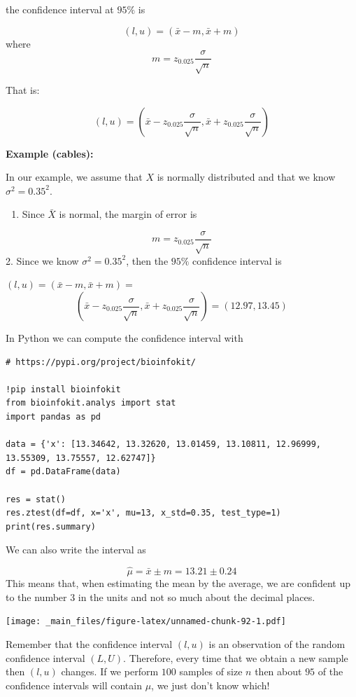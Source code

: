 \documentclass[
]{book}
\providecommand{\tightlist}{%
  \setlength{\itemsep}{0pt}\setlength{\parskip}{0pt}}
\begin{document}
the confidence interval at \(95\%\) is

\[(l,u)=(\bar{x} - m, \bar{x} + m)\]
where \[m=z_{0.025} \frac{\sigma}{\sqrt{n}}\]

That is:

\[(l,u)=(\bar{x} - z_{0.025} \frac{\sigma}{\sqrt{n}}, \bar{x} + z_{0.025} \frac{\sigma}{\sqrt{n}})\]

\textbf{Example (cables):}

In our example, we assume that \(X\) is normally distributed and that we know \(\sigma^2=0.35^2\).

\begin{enumerate}
\def\labelenumi{\arabic{enumi}.}
\tightlist
\item
  Since \(\bar{X}\) is normal, the margin of error is
\end{enumerate}

\[m=z_{0.025} \frac{\sigma}{\sqrt{n}}\]
2. Since we know \(\sigma^2=0.35^2\), then the \(95\%\) confidence interval is

\((l,u)=(\bar{x} - m, \bar{x} + m)=\) \[(\bar{x}-z_{0.025} \frac{\sigma}{\sqrt{n}}, \bar{x}+z_{0.025} \frac{\sigma}{\sqrt{n}})= (12.97,13.45)\]

In Python we can compute the confidence interval with

\begin{verbatim}
# https://pypi.org/project/bioinfokit/

!pip install bioinfokit
from bioinfokit.analys import stat
import pandas as pd

data = {'x': [13.34642, 13.32620, 13.01459, 13.10811, 12.96999, 13.55309, 13.75557, 12.62747]}
df = pd.DataFrame(data)

res = stat()
res.ztest(df=df, x='x', mu=13, x_std=0.35, test_type=1)
print(res.summary)
\end{verbatim}

We can also write the interval as

\[\hat{\mu}=\bar{x}  \pm m = 13.21 \pm 0.24\]
This means that, when estimating the mean by the average, we are confident up to the number 3 in the units and not so much about the decimal places.

\texttt{[image: \_main\_files/figure-latex/unnamed-chunk-92-1.pdf]}

Remember that the confidence interval \((l,u)\) is an observation of the random confidence interval \((L,U)\). Therefore, every time that we obtain a new sample then \((l,u)\) changes. If we perform \(100\) samples of size \(n\) then about \(95\) of the confidence intervals will contain \(\mu\), we just don't know which!
\end{document}
